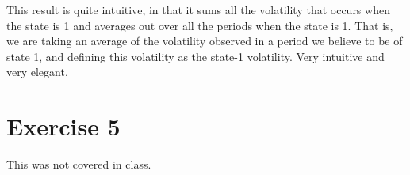 \documentclass[11pt,a4paper,oneside]{article}
\begin{document}
This result is quite intuitive, in that it sums all the volatility that occurs when the state is 1 and averages out over all the periods when the state is 1. That is, we are taking an average of the volatility observed in a period we believe to be of state 1, and defining this volatility as the state-1 volatility. Very intuitive and very elegant.

\clearpage

\section{Exercise 5}
This was not covered in class.
\end{document}
